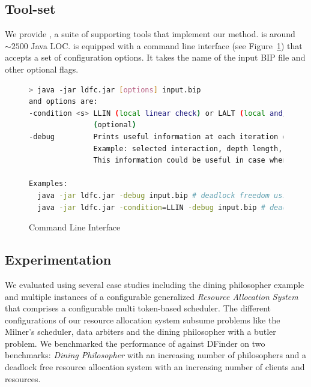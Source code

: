 





   \subsection{Tool-set}
   \label{s:tools}
%   


%
We provide \deadlocktool{}, a suite of supporting tools that implement our method. \deadlocktool{} is around $\sim 2500$ Java LOC.
%
\deadlocktool{} is equipped with a command line interface (see Figure~\ref{code:cmd-ldfc}) that accepts a set 
of configuration options. 
It takes the name of the input BIP file and other optional flags. 

\begin{figure}
\begin{lstlisting}[language=Bash]
> java -jar ldfc.jar [options] input.bip 
and options are:
-condition <s> LLIN (local linear check) or LALT (local and/or check - default)
               (optional)
-debug         Prints useful information at each iteration of checking. 
               Example: selected interaction, depth length, etc.
               This information could be useful in case when the condition fails.

Examples:
  java -jar ldfc.jar -debug input.bip # deadlock freedom using default LALT
  java -jar ldfc.jar -condition=LLIN -debug input.bip # deadlock freedom using LLIN
\end{lstlisting}
\caption{\deadlocktool{} Command Line Interface}
\label{code:cmd-ldfc}
\end{figure}




   \subsection{Experimentation}
   \label{s:experiments}
%   

We evaluated \deadlocktool{} using several case studies including the dining philosopher example and multiple instances
of a configurable generalized {\em Resource Allocation System} that comprises 
a configurable multi token-based scheduler.
The different configurations of our resource allocation system subsume problems like the Milner's scheduler, 
data arbiters and the dining philosopher with a butler problem. 
We benchmarked the performance of \deadlocktool{} against DFinder \cite{DFinder2}
on two benchmarks: 
{\em Dining Philosopher} with an increasing number of philosophers and 
a deadlock free resource allocation system with an increasing number of clients and resources. 

